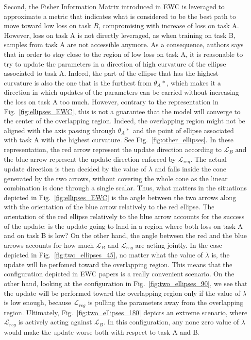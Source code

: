 \documentclass[11pt]{article}
\begin{document}
\vspace{2mm}
\noindent
Second, the Fisher Information Matrix introduced in EWC is leveraged to approximate a metric that indicates what is considered to be the best path to move toward low loss on task $B$, compromising with increase of loss on task A. However, loss on task A is not directly leveraged, as when training on task B, samples from task A are not accessible anymore. As a consequence, authors says that in order to stay close to the region of low loss on task A, it is reasonable to try to update the parameters in a direction of high curvature of the ellipse associated to task A. Indeed, the part of the ellipse that has the highest curvature is also the one that is the furthest from $\theta_A*$, which makes it a direction in which updates of the parameters can be carried without increasing the loss on task A too much. However, contrary to the representation in Fig.~\ref{fig:ellipses_EWC}, this is not a guarantee that the model will converge to the center of the overlapping region. Indeed, the overlapping region might not be aligned with the axis passing through $\theta_A*$ and the point of ellipse associated with task A with the highest curvature. See Fig.~\ref{fig:other_ellipses}. In these representation, the red arrow represent the update direction according to $\mathcal{L}_{B}$ and the blue arrow represent the update direction enforced by $\mathcal{L}_{reg}$. The actual update direction is then decided by the value of $\lambda$ and falls inside the cone generated by the two arrows, without covering the whole cone as the linear combination is done through a single scalar. Thus, what matters in the situations depicted in Fig.~\ref{fig:ellipses_EWC} is the angle between the two arrows along with the orientation of the blue arrow relatively to the red ellipse. The orientation of the red ellipse relatively to the blue arrow accounts for the success of the update: is the update going to land in a region where both loss on task A and on task B is low? On the other hand, the angle between the red and the blue arrows accounts for how much $\mathcal{L}_{B}$ and $\mathcal{L}_{reg}$ are acting jointly. In the case depicted in Fig.~\ref{fig:two_ellipses_45}, no matter what the value of $\lambda$ is, the update will be perfomed toward the overlapping region. This means that the configuration depicted in EWC papers is a really convenient scenario. On the other hand, looking at the configuration in Fig.~\ref{fig:two_ellipses_90}, we see that the update will be performed toward the overlapping region only if the value of $\lambda$ is low enough, because $\mathcal{L}_{reg}$ is pulling the parameters away from the overlapping region. Ultimately, Fig.~\ref{fig:two_ellipses_180} depicts an extreme scenario, where $\mathcal{L}_{reg}$ is actively acting against $\mathcal{L}_B$. In this configuration, any none zero value of $\lambda$ would make the update worse both with respect to task A and B.
\end{document}
